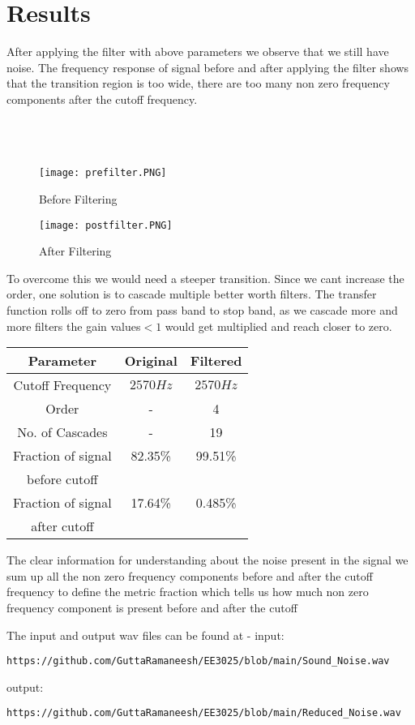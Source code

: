 \documentclass[journal,12pt,twocolumn]{IEEEtran}
\begin{document}
\section{\textbf{Results}}
    After applying the filter with above parameters we observe that we still have noise. The frequency response of signal before and after applying the filter shows that the transition region is too wide, there are too many non zero frequency components after the cutoff frequency.
\\
\\
\\
\\
\captionsetup[figure]{label format=empty}
\begin{figure}[H]
\centering
\texttt{[image: prefilter.PNG]}
\caption{Before Filtering}
\label{fig:Figure.1}
\texttt{[image: postfilter.PNG]}
\caption{After Filtering}
\label{fig:Figure.2}
\end{figure}
    To overcome this we would need a steeper transition. Since we cant increase the order, one solution is to cascade multiple better worth filters. The transfer function rolls off to zero from pass band to stop band, as we cascade more and more filters the gain values$<1$ would get multiplied and reach closer to zero.
\begin{center}
\begin{tabular}{ |c|c|c| } 
 \hline
 Parameter & Original & Filtered\\
 \hline
 Cutoff Frequency & $2570Hz$ & $2570 Hz$\\ 
 \hline
 Order & - & 4\\ 
 \hline
No. of Cascades & - & 19\\ 
 \hline
Fraction of signal & 82.35\% & 99.51\%\\
before cutoff & & &\\
\hline
Fraction of signal  & 17.64\% & 0.485\%\\
after cutoff & & &\\
\hline
\end{tabular}
\end{center}
The clear information for understanding about the  noise present in the signal we sum up all the non zero frequency
components before and after the cutoff frequency to define the metric fraction which tells us how much non zero frequency component is present before and after the cutoff

The input and output wav files can be found at -
input:
\begin{lstlisting}
https://github.com/GuttaRamaneesh/EE3025/blob/main/Sound_Noise.wav
\end{lstlisting}
output:
\begin{lstlisting}
https://github.com/GuttaRamaneesh/EE3025/blob/main/Reduced_Noise.wav
\end{lstlisting}
\end{document}
